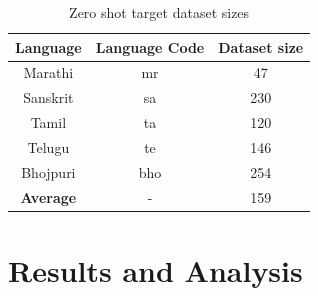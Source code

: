 \begin{table}[ht]
    \begin{center}
        \begin{tabular}{|c|c||c|}
            \hline
            \textbf{Language} & \textbf{Language Code} & \textbf{Dataset size} \\
            \hline
            Marathi & mr & 47 \\
            \hline
            Sanskrit & sa & 230 \\
            \hline
            Tamil & ta & 120 \\
            \hline
            Telugu & te & 146 \\
            \hline
            Bhojpuri & bho & 254 \\
            \hline
            \textbf{Average} & - & 159 \\
            \hline
        \end{tabular}
        \caption{Zero shot target dataset sizes}
        \label{table:zero_shot_dataset_sizes}
    \end{center}
\end{table}


\chapter{Results and Analysis}
